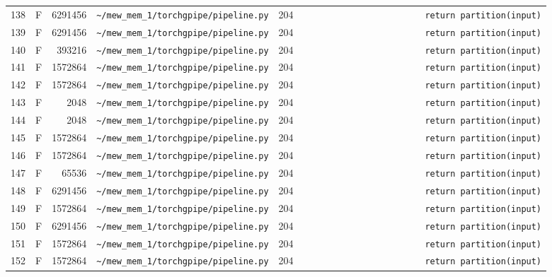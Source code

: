 \documentclass{article}
\begin{document}
\begin{longtable}{r l r p{6.5cm} r p{7.0cm}}
138 & F & 6291456 & \lstinline|~/mew_mem_1/torchgpipe/pipeline.py| & 204 & \lstinline|                        return partition(input)| \\
139 & F & 6291456 & \lstinline|~/mew_mem_1/torchgpipe/pipeline.py| & 204 & \lstinline|                        return partition(input)| \\
140 & F & 393216 & \lstinline|~/mew_mem_1/torchgpipe/pipeline.py| & 204 & \lstinline|                        return partition(input)| \\
141 & F & 1572864 & \lstinline|~/mew_mem_1/torchgpipe/pipeline.py| & 204 & \lstinline|                        return partition(input)| \\
142 & F & 1572864 & \lstinline|~/mew_mem_1/torchgpipe/pipeline.py| & 204 & \lstinline|                        return partition(input)| \\
143 & F & 2048 & \lstinline|~/mew_mem_1/torchgpipe/pipeline.py| & 204 & \lstinline|                        return partition(input)| \\
144 & F & 2048 & \lstinline|~/mew_mem_1/torchgpipe/pipeline.py| & 204 & \lstinline|                        return partition(input)| \\
145 & F & 1572864 & \lstinline|~/mew_mem_1/torchgpipe/pipeline.py| & 204 & \lstinline|                        return partition(input)| \\
146 & F & 1572864 & \lstinline|~/mew_mem_1/torchgpipe/pipeline.py| & 204 & \lstinline|                        return partition(input)| \\
147 & F & 65536 & \lstinline|~/mew_mem_1/torchgpipe/pipeline.py| & 204 & \lstinline|                        return partition(input)| \\
148 & F & 6291456 & \lstinline|~/mew_mem_1/torchgpipe/pipeline.py| & 204 & \lstinline|                        return partition(input)| \\
149 & F & 1572864 & \lstinline|~/mew_mem_1/torchgpipe/pipeline.py| & 204 & \lstinline|                        return partition(input)| \\
150 & F & 6291456 & \lstinline|~/mew_mem_1/torchgpipe/pipeline.py| & 204 & \lstinline|                        return partition(input)| \\
151 & F & 1572864 & \lstinline|~/mew_mem_1/torchgpipe/pipeline.py| & 204 & \lstinline|                        return partition(input)| \\
152 & F & 1572864 & \lstinline|~/mew_mem_1/torchgpipe/pipeline.py| & 204 & \lstinline|                        return partition(input)| \\

\end{longtable}
\end{document}
